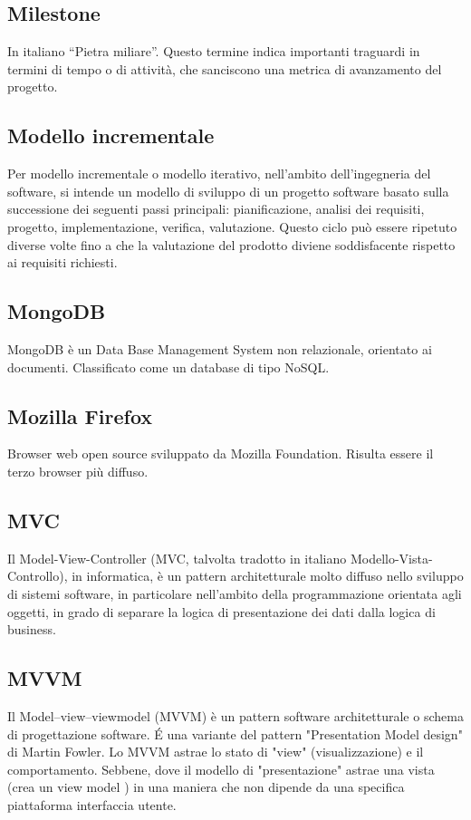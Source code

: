 \subsection*{Milestone}
In italiano “Pietra miliare”. Questo termine indica importanti traguardi in termini di
tempo o di attività, che sanciscono una metrica di avanzamento del progetto.

\subsection*{Modello incrementale}
Per modello incrementale o modello iterativo, nell'ambito dell'ingegneria
del software, si intende un modello di sviluppo di un progetto software basato sulla successione
dei seguenti passi principali: pianificazione, analisi dei requisiti, progetto, implementazione,
verifica, valutazione. Questo ciclo può essere ripetuto diverse volte fino a che la valutazione
del prodotto diviene soddisfacente rispetto ai requisiti richiesti.

\subsection*{MongoDB}
MongoDB è un Data Base Management System non relazionale, orientato ai documenti. Classificato come un database di tipo NoSQL.

\subsection*{Mozilla Firefox}
Browser web open source sviluppato da Mozilla Foundation. Risulta essere il terzo
browser più diffuso.

\subsection*{MVC}
Il Model-View-Controller (MVC, talvolta tradotto in italiano Modello-Vista-Controllo), in informatica, è un pattern architetturale molto diffuso nello sviluppo di sistemi software, in particolare nell'ambito della programmazione orientata agli oggetti, in grado di separare la logica di presentazione dei dati dalla logica di business.

\subsection*{MVVM}
Il Model–view–viewmodel (MVVM) è un pattern software architetturale o schema di progettazione software. É una variante del pattern "Presentation Model design" di Martin Fowler. Lo MVVM astrae lo stato di "view" (visualizzazione) e il comportamento. Sebbene, dove il modello di "presentazione" astrae una vista (crea un view model ) in una maniera che non dipende da una specifica piattaforma interfaccia utente.

